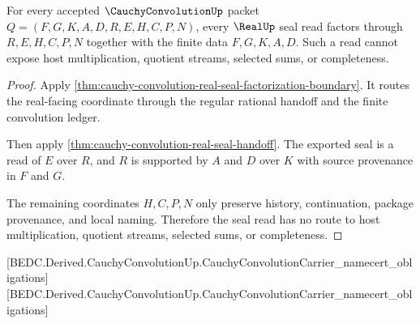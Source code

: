 \begin{theorem}
\label{thm:cauchy-convolution-seal-nonescape-obligation}
For every accepted $\CauchyConvolutionUp$ packet $Q=(F,G,K,A,D,R,E,H,C,P,N)$, every $\RealUp$ seal read factors through $R,E,H,C,P,N$ together with the finite data $F,G,K,A,D$. Such a read cannot expose host multiplication, quotient streams, selected sums, or completeness.
\end{theorem}
\begin{proof}
Apply \autoref{thm:cauchy-convolution-real-seal-factorization-boundary}. It routes the real-facing coordinate through the regular rational handoff and the finite convolution ledger.

Then apply \autoref{thm:cauchy-convolution-real-seal-handoff}. The exported seal is a read of $E$ over $R$, and $R$ is supported by $A$ and $D$ over $K$ with source provenance in $F$ and $G$.

The remaining coordinates $H,C,P,N$ only preserve history, continuation, package provenance, and local naming. Therefore the seal read has no route to host multiplication, quotient streams, selected sums, or completeness.
\end{proof}

[BEDC.Derived.CauchyConvolutionUp.CauchyConvolutionCarrier\_namecert\_obligations]
[BEDC.Derived.CauchyConvolutionUp.CauchyConvolutionCarrier\_namecert\_obligations]

\begin{closurestatus}{\CauchyConvolutionUp}
  \theoryclosure{\scopedClosure}
  \formalstatus{\axiomCleanV}
\end{closurestatus}
